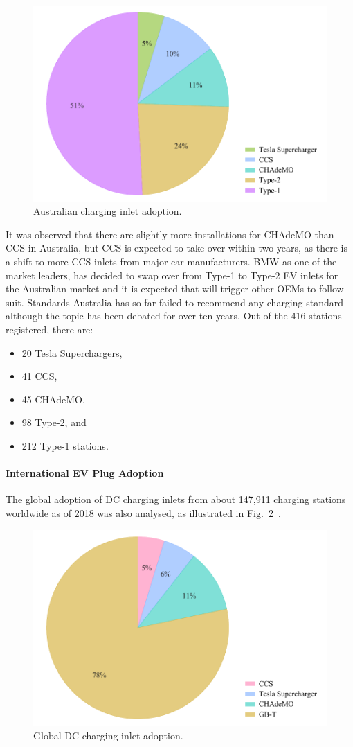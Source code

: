 \begin{figure}[H]
	\centering
	\includegraphics[width=0.7\linewidth]{ausplug}
	\caption{Australian charging inlet adoption.}
	\label{fig:10:ausplug}
\end{figure}

It was observed that there are slightly more installations for CHAdeMO than CCS in Australia, but CCS is expected to take over within two years, as there is a shift to more CCS inlets from major car manufacturers.
BMW as one of the market leaders, has decided to swap over from Type-1 to Type-2 EV inlets for the Australian market and it is expected that will trigger other OEMs to follow suit. Standards Australia has so far failed to recommend any charging standard although the topic has been debated for over ten years. Out of the 416 stations registered, there are:
\begin{itemize}
	\item 20 Tesla Superchargers,
	\item 41 CCS,
	\item 45 CHAdeMO,
	\item 98 Type-2, and
	\item 212 Type-1 stations. 
\end{itemize}

\paragraph{International EV Plug Adoption}
The global adoption of DC charging inlets from about 147,911 charging stations worldwide as of 2018 was also analysed, as illustrated in Fig.~\ref{fig:10:worldplug}~\cite{plugshare_plugshare_nodate}.

\begin{figure}[H]
	\centering
	\includegraphics[width=0.7\linewidth]{worldplug}
	\caption{Global DC charging inlet adoption.}
	\label{fig:10:worldplug}
\end{figure}
 
